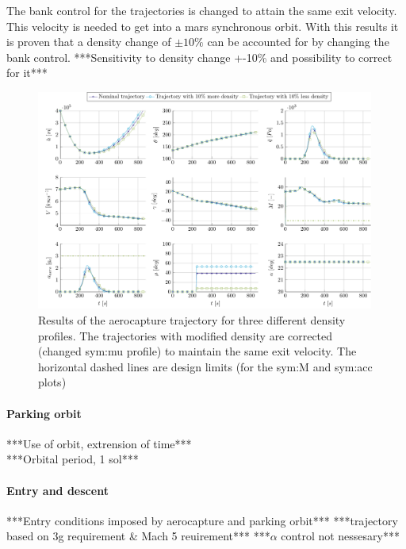The bank control for the trajectories is changed to attain the same exit velocity. This velocity is needed to get into a mars synchronous orbit. With this results it is proven that a density change of $\pm 10\%$ can be accounted for by changing the bank control. 
***Sensitivity to density change +-10\% and possibility to correct for it***\\
\begin{figure}
	\centering
	\includegraphics[width=0.99\textwidth]{Figure/Orbit/sensitivity_aerocapture.pdf}
	\caption{Results of the aerocapture trajectory for three different density profiles. The trajectories with modified density are corrected (changed \gls{sym:mu} profile) to maintain the same exit velocity. The horizontal dashed lines are design limits (for the \gls{sym:M} and \gls{sym:acc} plots) }
	\label{fig:orbit_aerocapture_data}
\end{figure}

\paragraph{Parking orbit}
***Use of orbit, extrension of time***\\
***Orbital period, 1 sol***\\

\paragraph{Entry and descent}
***Entry conditions imposed by aerocapture and parking orbit***
***trajectory based on 3g requirement \& Mach 5 reuirement***
***$\alpha$ control not nessesary***

